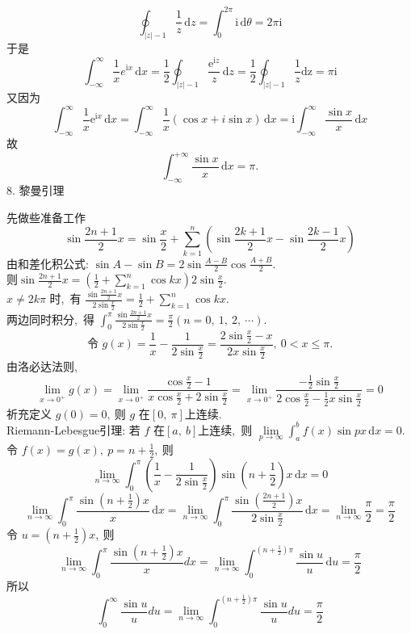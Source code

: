 \begin{solution}
		$$\oint_{|z|-1} \frac{1}{z}\,\mathrm{d}z=\int_{0}^{2 \pi} \mathrm{i}\,\mathrm{d} \theta=2 \pi \mathrm{i}$$
		于是
		$$\int_{-\infty}^{\infty} \frac{1}{x} e^{\mathrm{i}x} \,\mathrm{d}x=\frac{1}{2} \oint_{|z|-1} \frac{\mathrm{e}^{\mathrm{i} z}}{z} \,\mathrm{d}z=\frac{1}{2} \oint_{|z|-1} \frac{1}{z} \mathrm{dz}=\pi \mathrm{i}$$
		又因为
		$$\int_{-\infty}^{\infty} \frac{1}{x} \mathrm{e}^{\mathrm{i} x}\,\mathrm{d} x=\int_{-\infty}^{\infty} \frac{1}{x}(\cos x+i \sin x)\,\mathrm{d} x=\mathrm{i} \int_{-\infty}^{\infty} \frac{\sin x}{x} \,\mathrm{d}x$$
		故
		$$\int_{-\infty}^{+\infty}\frac{\sin x}{x}\,\mathrm{d}x=\pi.$$
		8. 黎曼引理
		
		先做些准备工作
		$$\sin \frac{2 n+1}{2}x=\sin \frac{x}{2}+\sum_{k=1}^{n}\left(\sin \frac{2 k+1}{2} x-\sin \frac{2k-1}{2}x\right)$$
		由和差化积公式:  $\sin A-\sin B=2 \sin \frac{A-B}{2} \cos \frac{A+B}{2} .$\\
		则$  \sin \frac{2 n+1}{2} x=\left(\frac{1}{2}+\sum_{k=1}^{n} \cos kx\right) 2 \sin \frac{x}{2} .$\\
		$x\neq 2k\pi $ 时,\  有 $ \frac{\sin \frac{2 n+1}{2}x}{2 \sin \frac{x}{2}}=\frac{1}{2}+\sum_{k=1}^{n} \cos kx .$\\
		两边同时积分,\  得 $ \int_{0}^{\pi} \frac{\sin \frac{2 n+1}{2}x}{2 \sin \frac{x}{2}}=\frac{\pi}{2}(n=0,\ 1,\ 2,\  \cdots) .$
		$$\text { 令 } g(x)=\frac{1}{x}-\frac{1}{2 \sin \frac{x}{2}}=\frac{2 \sin \frac{x}{2}-x}{2 x \sin \frac{x}{2}},\  0<x \leq \pi \text {. }$$
		由洛必达法则,\ 
		$$\lim\limits_{x \rightarrow 0^{+}} g(x)=\lim\limits_{x \rightarrow 0^{+}} \frac{\cos \frac{x}{2}-1}{x \cos \frac{x}{2}+2 \sin \frac{x}{2}}=\lim\limits_{x \rightarrow 0^{+}} \frac{-\frac{1}{2} \sin \frac{x}{2}}{2 \cos \frac{x}{2}-\frac{1}{2} x \sin \frac{x}{2}}=0$$
		祈充定义 $ g(0)=0 ,\  $则  $g$ 在$  [0,\  \pi]  $上连续.\\
		Riemann-Lebesgue引理: 若 $f$  在$  [a,\ b]  $上连续,\  则  $\lim\limits_{p \rightarrow \infty} \int_{a}^{b}f(x) \sin px\,\mathrm{d}x=0 .$\\
		令  $f(x)=g(x),\  p=n+\frac{1}{2} ,\  $则
		$$\lim\limits_{n \rightarrow \infty} \int_{0}^{\pi}\left(\frac{1}{x}-\frac{1}{2 \sin \frac{x}{2}}\right) \sin \left(n+\frac{1}{2}\right) x\,\mathrm{d} x=0$$
		$$\lim\limits_{n \rightarrow \infty} \int_{0}^{\pi} \frac{\sin \left(n+\frac{1}{2}\right) x}{x} \,\mathrm{d} x=\lim\limits_{n \rightarrow \infty} \int_{0}^{\pi} \frac{\sin \left(\frac{2 n+1}{2}\right) x}{2 \sin \frac{x}{2}} \,\mathrm{d}x=\lim\limits_{n \rightarrow \infty} \frac{\pi}{2}=\frac{\pi}{2}$$
		令  $u=\left(n+\frac{1}{2}\right)x,\  $则
		$$\lim\limits_{n \rightarrow \infty} \int_{0}^{\pi} \frac{\sin \left(n+\frac{1}{2}\right) x}{x} d x=\lim\limits_{n \rightarrow \infty} \int_{0}^{\left(n+\frac{1}{2}\right) \pi} \frac{\sin u}{u}\,\mathrm{d} u=\frac{\pi}{2}$$
		所以
		$$\int_{0}^{\infty} \frac{\sin u}{u} d u=\lim\limits_{n \rightarrow \infty} \int_{0}^{\left(n+\frac{1}{2}\right) \pi} \frac{\sin u}{u} d u=\frac{\pi}{2}$$
	\end{solution}
